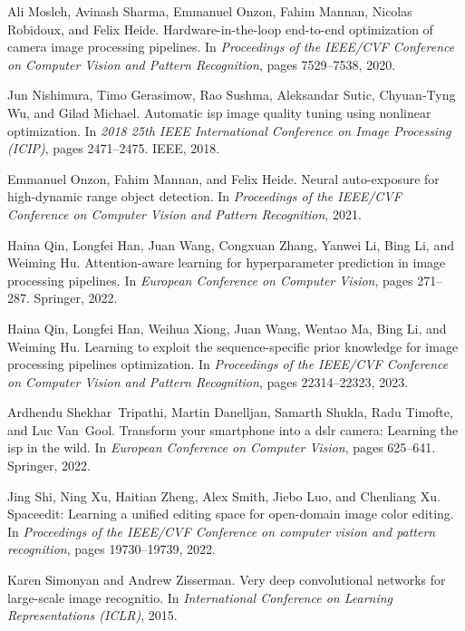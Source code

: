 \documentclass{article}
\begin{document}
\begin{thebibliography}{10}
Ali Mosleh, Avinash Sharma, Emmanuel Onzon, Fahim Mannan, Nicolas Robidoux, and Felix Heide.
\newblock Hardware-in-the-loop end-to-end optimization of camera image processing pipelines.
\newblock In {\em Proceedings of the IEEE/CVF Conference on Computer Vision and Pattern Recognition}, pages 7529--7538, 2020.

Jun Nishimura, Timo Gerasimow, Rao Sushma, Aleksandar Sutic, Chyuan-Tyng Wu, and Gilad Michael.
\newblock Automatic isp image quality tuning using nonlinear optimization.
\newblock In {\em 2018 25th IEEE International Conference on Image Processing (ICIP)}, pages 2471--2475. IEEE, 2018.

Emmanuel Onzon, Fahim Mannan, and Felix Heide.
\newblock Neural auto-exposure for high-dynamic range object detection.
\newblock In {\em Proceedings of the IEEE/CVF Conference on Computer Vision and Pattern Recognition}, 2021.

Haina Qin, Longfei Han, Juan Wang, Congxuan Zhang, Yanwei Li, Bing Li, and Weiming Hu.
\newblock Attention-aware learning for hyperparameter prediction in image processing pipelines.
\newblock In {\em European Conference on Computer Vision}, pages 271--287. Springer, 2022.

Haina Qin, Longfei Han, Weihua Xiong, Juan Wang, Wentao Ma, Bing Li, and Weiming Hu.
\newblock Learning to exploit the sequence-specific prior knowledge for image processing pipelines optimization.
\newblock In {\em Proceedings of the IEEE/CVF Conference on Computer Vision and Pattern Recognition}, pages 22314--22323, 2023.

Ardhendu Shekhar~Tripathi, Martin Danelljan, Samarth Shukla, Radu Timofte, and Luc Van~Gool.
\newblock Transform your smartphone into a dslr camera: Learning the isp in the wild.
\newblock In {\em European Conference on Computer Vision}, pages 625--641. Springer, 2022.

Jing Shi, Ning Xu, Haitian Zheng, Alex Smith, Jiebo Luo, and Chenliang Xu.
\newblock Spaceedit: Learning a unified editing space for open-domain image color editing.
\newblock In {\em Proceedings of the IEEE/CVF Conference on computer vision and pattern recognition}, pages 19730--19739, 2022.

Karen Simonyan and Andrew Zisserman.
\newblock Very deep convolutional networks for large-scale image recognitio.
\newblock In {\em International Conference on Learning Representations (ICLR)}, 2015.


\end{thebibliography}
\end{document}
